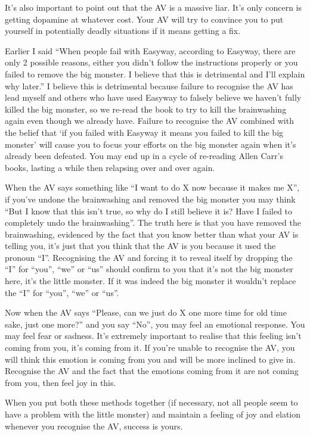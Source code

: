 \documentclass[
]{book}
\begin{document}
It's also important to point out that the AV is a massive liar. It's only concern is getting dopamine at whatever cost. Your AV will try to convince you to put yourself in potentially deadly situations if it means getting a fix.

Earlier I said ``When people fail with Easyway, according to Easyway, there are only 2 possible reasons, either you didn't follow the instructions properly or you failed to remove the big monster. I believe that this is detrimental and I'll explain why later.'' I believe this is detrimental because failure to recognise the AV has lead myself and others who have used Easyway to falsely believe we haven't fully killed the big monster, so we re-read the book to try to kill the brainwashing again even though we already have. Failure to recognise the AV combined with the belief that `if you failed with Easyway it means you failed to kill the big monster' will cause you to focus your efforts on the big monster again when it's already been defeated. You may end up in a cycle of re-reading Allen Carr's books, lasting a while then relapsing over and over again.

When the AV says something like ``I want to do X now because it makes me X'', if you've undone the brainwashing and removed the big monster you may think ``But I know that this isn't true, so why do I still believe it is? Have I failed to completely undo the brainwashing''. The truth here is that you have removed the brainwashing, evidenced by the fact that you know better than what your AV is telling you, it's just that you think that the AV is you because it used the pronoun ``I''. Recognising the AV and forcing it to reveal itself by dropping the ``I'' for ``you'', ``we'' or ``us'' should confirm to you that it's not the big monster here, it's the little monster. If it was indeed the big monster it wouldn't replace the ``I'' for ``you'', ``we'' or ``us''.

Now when the AV says ``Please, can we just do X one more time for old time sake, just one more?'' and you say ``No'', you may feel an emotional response. You may feel fear or sadness. It's extremely important to realise that this feeling isn't coming from you, it's coming from it. If you're unable to recognise the AV, you will think this emotion is coming from you and will be more inclined to give in. Recognise the AV and the fact that the emotions coming from it are not coming from you, then feel joy in this.

When you put both these methods together (if necessary, not all people seem to have a problem with the little monster) and maintain a feeling of joy and elation whenever you recognise the AV, success is yours.

  
\end{document}
